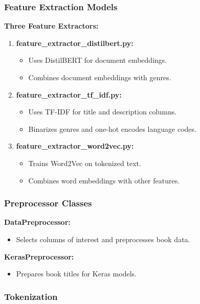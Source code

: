 \documentclass{article}
\begin{document}
\subsubsection{Feature Extraction Models}

\textbf{Three Feature Extractors:}
\begin{enumerate}
    \item \textbf{feature\_extractor\_distilbert.py:}
    \begin{itemize}
        \item Uses DistilBERT for document embeddings.
        \item Combines document embeddings with genres.
    \end{itemize}
    \item \textbf{feature\_extractor\_tf\_idf.py:}
    \begin{itemize}
        \item Uses TF-IDF for title and description columns.
        \item Binarizes genres and one-hot encodes language codes.
    \end{itemize}
    \item \textbf{feature\_extractor\_word2vec.py:}
    \begin{itemize}
        \item Trains Word2Vec on tokenized text.
        \item Combines word embeddings with other features.
    \end{itemize}
\end{enumerate}

\subsubsection{Preprocessor Classes}

\textbf{DataPreprocessor:}
\begin{itemize}
    \item Selects columns of interest and preprocesses book data.
\end{itemize}

\textbf{KerasPreprocessor:}
\begin{itemize}
    \item Prepares book titles for Keras models.
\end{itemize}

\subsubsection{Tokenization}
\end{document}

